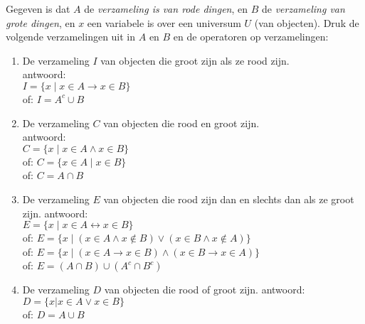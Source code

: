 \begin{answer} %
Gegeven is dat $A$ de \textit{verzameling is van rode dingen}, en $B$ de \textit{verzameling van grote dingen}, en $x$ een variabele is over een universum $U$ (van objecten). Druk de volgende verzamelingen uit in $A$ en $B$ en de operatoren op verzamelingen:
\begin{enumerate}[label=\textit{\alph*.}]
    \item De verzameling $I$ van objecten die groot zijn als ze rood zijn.\\
    antwoord: \\
    $I = \{ x\;|\;x \in A \rightarrow x \in B\}$ \\
    of: $I = A^c\cup B$
    \item De verzameling $C$ van objecten die rood en groot zijn.\\
    antwoord: \\
    $C = \{x\;|\;x \in A\land x\in B\}$ \\
    of: $C = \{x\in A\;|\;x\in B\}$ \\
    of: $C = A \cap B$
    \item De verzameling $E$ van objecten die rood zijn dan en slechts dan als ze groot zijn.
    antwoord: \\
    $E = \{x\;|\;x\in A \leftrightarrow x\in B\}$ \\
    of: $E = \{x\;|\;(x\in A \land x\not\in B)\lor(x\in B\land x\not\in A)\}$ \\
    of: $E = \{x\;|\;(x\in A\rightarrow x\in B)\land (x\in B\rightarrow x\in A)\}$ \\
    of: $E = (A \cap B)\cup(A^c\cap B^c)$
    \item De verzameling $D$ van objecten die rood of groot zijn.
    antwoord: \\
    $D = \{x | x\in A \lor x\in B\}$\\
    of: $D = A \cup B$
\end{enumerate}
\end{answer}

